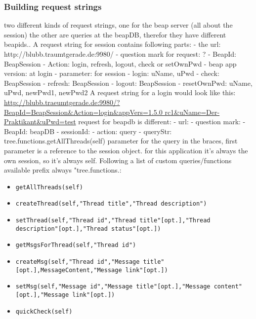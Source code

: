 \documentclass[12pt,a4paper,oneside]{report}
\newcommand{\code}[1]{\lstinline{#1}}
\begin{document}
\subsubsection{Building request strings}
two different kinds of request strings, one for the beap server (all about the session) the other are queries at the beapDB, therefor they have different beapids..
A request string for session contains following parts:
 	- the url: http://blubb.traumtgerade.de:9980/
 	- question mark for request: ?
 	- BeapId: BeapSession 
 	- Action: login, refresh, logout, check or setOwnPwd 
 	- beap app version: at login
 	- parameter: for session
 		- login: uName, uPwd
 		- check: BeapSession
 		- refresh: BeapSession
 		- logout: BeapSession
 		- resetOwnPwd: uName, uPwd, newPwd1, newPwd2
A request string for a login would look like this:
\url{http://blubb.traeumtgerade.de:9980/?BeapId=BeapSession&Action=login&appVers=1.5.0 rc1&uName=Der-Praktikant&uPwd=test}
request for beapdb is different:
	- url:
	- question mark:
	- BeapId: beapDB
	- sessionId:
	- action: query
	- queryStr: tree.functions.getAllThreads(self)
parameter for the query in the braces, first parameter is a reference to the session object. for this application it's always the own session, so it's always self.
Following a list of custom queries/functions available prefix always "tree.functions.:
\begin{itemize}
\item{\code{getAllThreads(self)}}
\item{\code{createThread(self,"Thread title","Thread description")}}
\item{\code{setThread(self,"Thread id","Thread title"[opt.],"Thread description"[opt.],"Thread status"[opt.])}}
\item{\code{getMsgsForThread(self,"Thread id")}}
\item{\code{createMsg(self,"Thread id","Message title"[opt.],MessageContent,"Message link"[opt.])}}
\item{\code{setMsg(self,"Message id","Message title"[opt.],"Message content"[opt.],"Message link"[opt.])}}
\item{\code{quickCheck(self)}}
\end{itemize}
\end{document}
